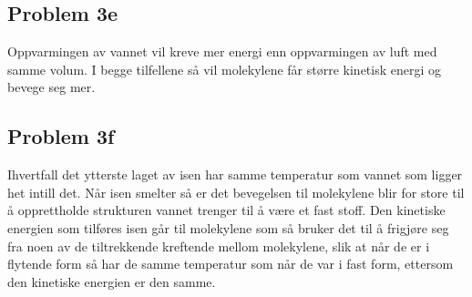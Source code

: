 \documentclass[ reprint, amsmath,amssymb, aps]{revtex4-2}
\begin{document}
\subsection*{Problem 3e}

Oppvarmingen av vannet vil kreve mer energi enn oppvarmingen av luft med samme volum. I begge tilfellene så vil molekylene får større kinetisk energi og bevege seg mer. 

\subsection*{Problem 3f}

Ihvertfall det ytterste laget av isen har samme temperatur som vannet som ligger het intill det. Når isen smelter så er det bevegelsen til molekylene blir for store til å opprettholde strukturen vannet trenger til å være et fast stoff. Den kinetiske energien som tilføres isen går til molekylene som så bruker det til å frigjøre seg fra noen av de tiltrekkende kreftende mellom molekylene, slik at når de er i flytende form så har de samme temperatur som når de var i fast form, ettersom den kinetiske energien er den samme.
\end{document}
